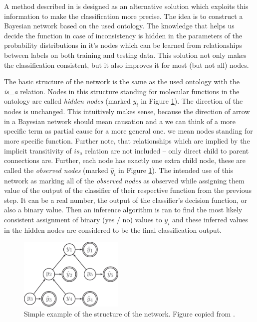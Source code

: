 \documentclass[11pt,twoside,a4paper]{book}
\begin{document}
A method described in \cite{bnet} is designed
as an alternative solution which exploits this
information to make the classification more precise.
The idea is to construct a Bayesian network based on
the used ontology.
The knowledge that helps us decide the function
in case of inconsistency
is hidden in the parameters of the probability 
distributions in it's nodes 
which can be learned from relationships between
labels on both training and testing data.
This solution not only makes the classification 
consistent,
but it also improves it for most (but not all) nodes.

The basic structure of the network is the same as the used ontology 
with the \emph{is\_a} relation. 
Nodes in this structure standing for molecular functions
in the ontology are called \emph{hidden nodes} (marked $y_i$ in Figure \ref{fig:net}). 
The direction of the nodes is unchanged.
This intuitively makes sense,
because the direction of arrow in a Bayesian 
network should mean causation
and a we can think of a more specific term as partial cause
for a more general one.
we mean nodes standing for more specific function.
Further note, that relationships which are implied by the implicit transitivity
of $is_a$ relation are not included -- only direct child to parent connections are.
Further, each node has exactly one extra child node, these
are called the \emph{observed nodes} (marked $\hat{y}_i$ in Figure \ref{fig:net}).
The intended use of this network
as marking all of the \emph{observed nodes}  as observed
while assigning them value of the output 
of the classifier of their respective function from the previous step.
It can be a real number, the output of the classifier's decision function,
or also a binary value.
Then an inference algorithm is ran
to find the most likely consistent assignment of binary (yes / no) values to $y_i$
and these inferred values in the hidden nodes 
are considered to be the final classification output.

\begin{figure}[h]
\begin{center}
\includegraphics[width=5cm]{figures/net}
\caption{Simple example of the structure of the network.
Figure copied from \cite{bnet}.}
\label{fig:net}
\end{center}
\end{figure}
\end{document}
